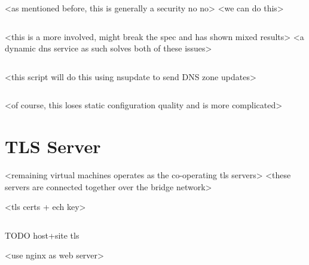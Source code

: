 \begin{listing}[ht]
\inputminted{zone}{snippets/shared.example.zone}
\caption[example.com zone file for distributed ECH using a shared ECH key]{}
\end{listing}

<as mentioned before, this is generally a security no no>
<we can do this>

\begin{listing}[ht]
\inputminted{zone}{snippets/separate.example.zone}
\caption[example.com zone file for distributed ECH using separate ECH keys]{}
\end{listing}

<this is a more involved, might break the spec and has shown mixed results>
<a dynamic dns service as such solves both of these issues>

\begin{listing}[ht]
\inputminted{zone}{snippets/dynamic.example.zone}
\caption[example.com zone file for distributed ECH using dynamic DNS]{}
\end{listing}

<this script will do this using nsupdate to send DNS zone updates>

\begin{listing}[ht]
\inputminted{zone}{snippets/dynamic.example.zone.bash}
\caption[Rudimentary script to implement a dynamic DNS service]{}
\end{listing}

<of course, this loses static configuration quality and is more complicated>











\section{TLS Server}

<remaining virtual machines operates as the co-operating tls servers>
<these servers are connected together over the bridge network>

<tls certs + ech key>

\begin{listing}[ht]
\inputminted{bash}{snippets/host_tls.bash}
\caption[Generating a new ECH key pair for tcd.example.com using OpenSSL]{TODO host+site tls}
\end{listing}

<use nginx as web server>
\cite{reese2008nginx}

